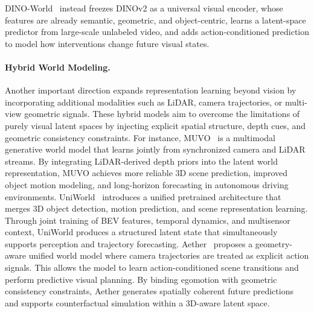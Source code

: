 DINO-World~\cite{baldassarre2025back} instead freezes DINOv2 as a universal visual encoder, whose features are already semantic, geometric, and object-centric, learns a latent-space predictor from large-scale unlabeled video, and adds action-conditioned prediction to model how interventions change future visual states.



\paragraph{Hybrid World Modeling.}
Another important direction expands representation learning beyond vision by incorporating additional modalities such as LiDAR, camera trajectories, or multi-view geometric signals.
These hybrid models aim to overcome the limitations of purely visual latent spaces by injecting explicit spatial structure, depth cues, and geometric consistency constraints.
For instance, {MUVO}~\cite{bogdoll2025muvo} is a multimodal generative world model that learns jointly from synchronized camera and LiDAR streams.
By integrating LiDAR-derived depth priors into the latent world representation, MUVO achieves more reliable 3D scene prediction, improved object motion modeling, and long-horizon forecasting in autonomous driving environments.
{UniWorld}~\cite{min2023uniworld} introduces a unified pretrained architecture that merges 3D object detection, motion prediction, and scene representation learning.
Through joint training of BEV features, temporal dynamics, and multisensor context, UniWorld produces a structured latent state that simultaneously supports perception and trajectory forecasting.
{Aether}~\cite{zhu2025aether} proposes a geometry-aware unified world model where camera trajectories are treated as explicit action signals.
This allows the model to learn action-conditioned scene transitions and perform predictive visual planning.
By binding egomotion with geometric consistency constraints, Aether generates spatially coherent future predictions and supports counterfactual simulation within a 3D-aware latent space.




